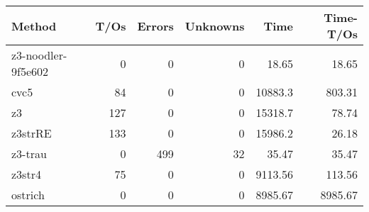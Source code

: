 \begin{tabular}{lrrrrr}
\hline
 Method             &   T/Os &   Errors &   Unknowns &     Time &   Time-T/Os \\
\hline
 z3-noodler-9f5e602 &      0 &        0 &          0 &    18.65 &       18.65 \\
 cvc5               &     84 &        0 &          0 & 10883.3  &      803.31 \\
 z3                 &    127 &        0 &          0 & 15318.7  &       78.74 \\
 z3strRE            &    133 &        0 &          0 & 15986.2  &       26.18 \\
 z3-trau            &      0 &      499 &         32 &    35.47 &       35.47 \\
 z3str4             &     75 &        0 &          0 &  9113.56 &      113.56 \\
 ostrich            &      0 &        0 &          0 &  8985.67 &     8985.67 \\
\hline
\end{tabular}
